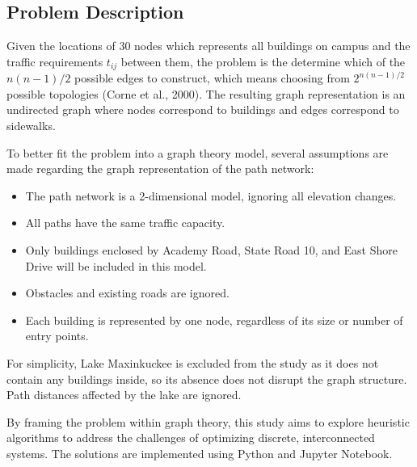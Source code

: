 \documentclass[11pt]{article}
\begin{document}
\subsection{Problem Description}
Given the locations of 30 nodes which represents all buildings on campus and the traffic requirements $t_{ij}$ between them, the problem is the determine which of the $n\left(n-1\right)/2$ possible edges to construct, which means choosing from $2^{n\left(n-1\right)/2}$ possible topologies (Corne et al., 2000). The resulting graph representation is an undirected graph where nodes correspond to buildings and edges correspond to sidewalks. \par
To better fit the problem into a graph theory model, several assumptions are made regarding the graph representation of the path network: 
\begin{itemize}
	\item The path network is a 2-dimensional model, ignoring all elevation changes. 
	\item All paths have the same traffic capacity. 
	\item Only buildings enclosed by Academy Road, State Road 10, and East Shore Drive will be included in this model. 
	\item Obstacles and existing roads are ignored.
	\item Each building is represented by one node, regardless of its size or number of entry points. 
\end{itemize} \par
For simplicity, Lake Maxinkuckee is excluded from the study as it does not contain any buildings inside, so its absence does not disrupt the graph structure. Path distances affected by the lake are ignored.\par
By framing the problem within graph theory, this study aims to explore heuristic algorithms to address the challenges of optimizing discrete, interconnected systems. The solutions are implemented using Python and Jupyter Notebook.\\
\end{document}
